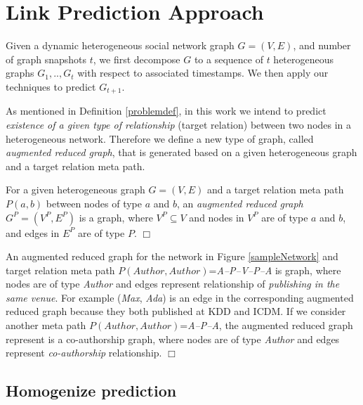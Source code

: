 \section{Link Prediction Approach}

Given a dynamic heterogeneous social network graph $G=(V,E)$, and number of graph snapshots $t$, we first decompose $G$ to a sequence of $t$ heterogeneous graphs ${G_1, .., G_t}$ with respect to associated timestamps. We then apply our techniques to predict $G_{t+1}$.

As mentioned in Definition \ref{problemdef}, in this work we intend to predict \textit{existence of a given type of relationship} (target relation) between two nodes in a heterogeneous network. Therefore we define a new type of graph, called \textit{augmented reduced graph}, that is generated based on a given heterogeneous graph and a target relation meta path. 

\begin{definition}\label{def:ARG}
For a given heterogeneous graph $G=(V,E)$ and a target relation meta path $P(a,b)$ between nodes of type $a$ and $b$, an \textit{augmented reduced graph} $G^P=(V^P,E^P)$ is a graph, where $V^P \subseteq V$ and nodes in $V^P$ are of type $a$ and $b$, and edges in $E^P$ are of type $P$. $\Box$
\end{definition}

\begin{example}
An augmented reduced graph for the network in Figure \ref{sampleNetwork} and target relation meta path $P(Author,Author)$=\textit{A--P--V--P--A} is graph, where nodes are of type \textit{Author} and edges represent relationship of \textit{publishing in the same venue}. For example (\textit{Max}, \textit{Ada}) is an edge in the corresponding augmented reduced graph because they both published at KDD and ICDM. If we consider another meta path $P(Author,Author)$=\textit{A--P--A}, the augmented reduced graph represent is a co-authorship graph, where nodes are of type \textit{Author} and edges represent \textit{co-authorship} relationship.  $\Box$

\end{example}



\subsection{Homogenize prediction}


